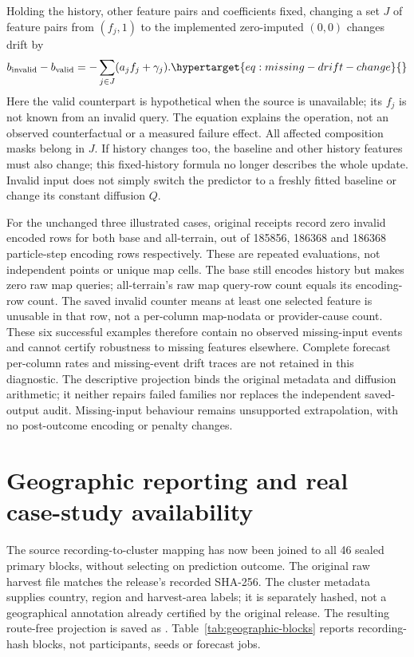 Holding the history, other feature pairs and coefficients fixed, changing
a set \(J\) of feature pairs from \((f_j,1)\) to the implemented
zero-imputed \((0,0)\) changes drift by
\begin{equation}
 b_{\rm invalid}-b_{\rm valid}
       =-\sum_{j\in J}(a_j f_j+\gamma_j).
 \label{eq:missing-drift-change}\hypertarget{eq:missing-drift-change}{}
\end{equation}
Here the valid counterpart is hypothetical when the source is unavailable;
its \(f_j\) is not known from an invalid query. The equation explains the
operation, not an observed counterfactual or a measured failure effect.
All affected composition masks belong in \(J\). If history changes too,
the baseline and other history features must also change; this fixed-history
formula no longer describes the whole update. Invalid input does not simply
switch the predictor to a freshly fitted baseline or change its constant
diffusion \(Q\).

For the unchanged three illustrated cases, original receipts record zero
invalid encoded rows for both base and all-terrain, out of 185856,
186368 and 186368 particle-step encoding rows respectively. These are
repeated evaluations, not independent points or unique map cells. The base
still encodes history but makes zero raw map queries; all-terrain's raw map
query-row count equals its encoding-row count. The saved invalid counter
means at least one selected feature is unusable in that row, not a
per-column map-nodata or provider-cause count. These six successful examples
therefore contain no observed missing-input events and cannot certify
robustness to missing features elsewhere. Complete forecast per-column
rates and missing-event drift traces are not retained in this diagnostic.
The descriptive projection
 binds the original
metadata and diffusion arithmetic; it neither repairs failed families nor
replaces the independent saved-output audit. Missing-input behaviour remains
unsupported extrapolation, with no post-outcome encoding or penalty changes.


\section{Geographic reporting and real case-study availability}
The source recording-to-cluster mapping has now been joined to all 46 sealed
primary blocks, without selecting on prediction outcome. The original raw
harvest file matches the release's recorded SHA-256. The cluster metadata
supplies country, region and harvest-area labels; it is separately hashed,
not a geographical annotation already certified by the original release.
The resulting route-free projection is saved as
. Table~\ref{tab:geographic-blocks}
reports recording-hash blocks, not participants, seeds or forecast jobs.

